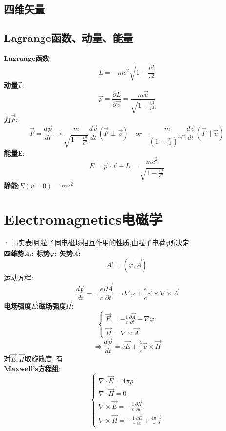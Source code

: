 \documentclass{article}
\begin{document}
\subsection{四维矢量}


\subsection{Lagrange函数、动量、能量}
\textbf{Lagrange函数}:
\[L = -m c^2 \sqrt{1 - \frac{v^2}{c^2}}\]
\textbf{动量$\vec p$}:
\[\vec p = \frac{\partial L}{\partial \vec v} = \frac{m \vec v}{\sqrt{1 - \frac{v^2}{c^2}}}\]
\textbf{力$\vec F$}:
\[\vec F = \frac{d\vec p}{dt} \to \frac{m}{\sqrt{1 - \frac{v^2}{c^2}}} \frac{d\vec v}{dt}(\vec F \perp \vec v) 
\quad or\quad  \frac{m}{(1 - \frac{v^2}{c^2})^{3/2}} \frac{d\vec v}{dt} (\vec F \parallel \vec v)\]
\textbf{能量E}:
\[E = \vec p \cdot \vec v - L = \frac{mc^2}{\sqrt{1 - \frac{v^2}{c^2}}}\]
\textbf{静能}:\quad $E(v=0) = mc^2$\\



\section{Electromagnetics电磁学}


· 事实表明,粒子同电磁场相互作用的性质,由粒子电荷$q$所决定.\\
\textbf{四维势$A_{i}$: \quad 标势$\varphi$: \quad 矢势$\vec A$:}
\[A^{i}=(\varphi,\vec A)\]
运动方程:
\[\frac{d\vec p}{dt} = - \frac{e}{c} \frac{\partial\vec A}{\partial t} - e \nabla \varphi + \frac{e}{c} \vec v \times \nabla \times \vec A\]
\textbf{电场强度$\vec E$:\quad 磁场强度$\vec H$:}
\begin{displaymath}
    \left\{ \begin{array}{ll}
    \vec E = -\frac{1}{c} \frac{\partial \vec A}{\partial t} - \nabla \varphi\\
    \vec H = \nabla \times \vec A
    \end{array} \right.
\end{displaymath}
\[\Rightarrow \frac{d\vec p}{dt} = e \vec E + \frac{e}{c} \vec v \times \vec H\]
对$\vec E,\vec H$取旋散度, 有\\
\textbf{Maxwell's方程组}:
\begin{displaymath}
    \left\{ \begin{array}{ll}
    \nabla \cdot \vec E = 4\pi\rho\\
    \nabla \cdot \vec H = 0\\
    \nabla \times \vec E = - \frac{1}{c} \frac{\partial \vec H}{\partial t}\\
    \nabla \times \vec H = - \frac{1}{c} \frac{\partial \vec E}{\partial t} + \frac{4\pi}{c}\vec j
    \end{array} \right.
\end{displaymath}
\end{document}
